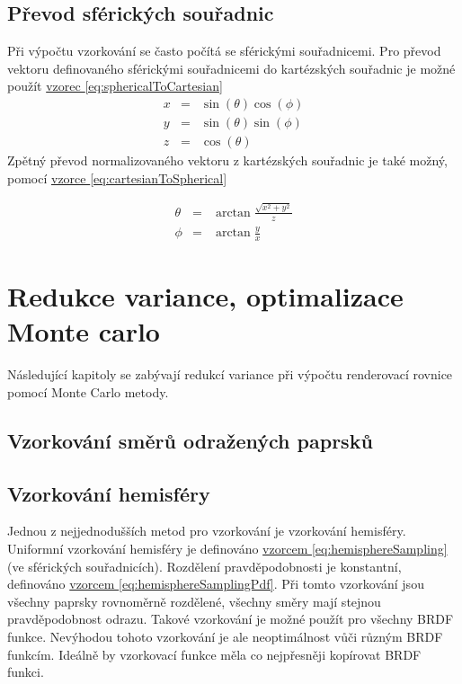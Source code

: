\documentclass[czech,master,dept460,male,cpp,cpdeclaration]{diploma}
\begin{document}
\subsection{Převod sférických souřadnic}
Při výpočtu vzorkování se často počítá se sférickými souřadnicemi. Pro převod vektoru definovaného sférickými souřadnicemi do kartézských souřadnic je možné použít \hyperref[eq:sphericalToCartesian]{vzorec \ref{eq:sphericalToCartesian}}
\begin{eqnarray}
    x & = & \sin(\theta)\cos(\phi)\nonumber \\
    y & = & \sin(\theta)\sin(\phi)\nonumber \\
    z & = & \cos(\theta)\label{eq:sphericalToCartesian}
\end{eqnarray}
Zpětný převod normalizovaného vektoru z kartézských souřadnic je také možný, pomocí \hyperref[eq:cartesianToSpherical]{vzorce \ref{eq:cartesianToSpherical}}

\begin{eqnarray}
    \theta & = & \arctan \frac{\sqrt{x^2 + y^2}}{z} \nonumber \\
    \phi & = & \arctan \frac{y}{x}\label{eq:cartesianToSpherical}
\end{eqnarray}

\clearpage
\section{Redukce variance, optimalizace Monte carlo} \label{sec:reduction}
Následující kapitoly se zabývají redukcí variance při výpočtu renderovací rovnice pomocí Monte Carlo metody.

\subsection{Vzorkování směrů odražených paprsků}

\subsection{Vzorkování hemisféry} \label{sec:hemisphere}
Jednou z nejjednodušších metod pro vzorkování je vzorkování hemisféry. Uniformní vzorkování hemisféry je definováno \hyperref[eq:hemisphereSampling]{vzorcem \ref{eq:hemisphereSampling}} (ve sférických souřadnicích). Rozdělení pravděpodobnosti je konstantní, definováno \hyperref[eq:hemisphereSamplingPdf]{vzorcem \ref{eq:hemisphereSamplingPdf}}. Při tomto vzorkování jsou všechny paprsky rovnoměrně rozdělené, všechny směry mají stejnou pravděpodobnost odrazu. Takové vzorkování je možné použít pro všechny BRDF funkce. Nevýhodou tohoto vzorkování je ale neoptimálnost vůči různým BRDF funkcím. Ideálně by vzorkovací funkce měla co nejpřesněji kopírovat BRDF funkci. \par
\end{document}
